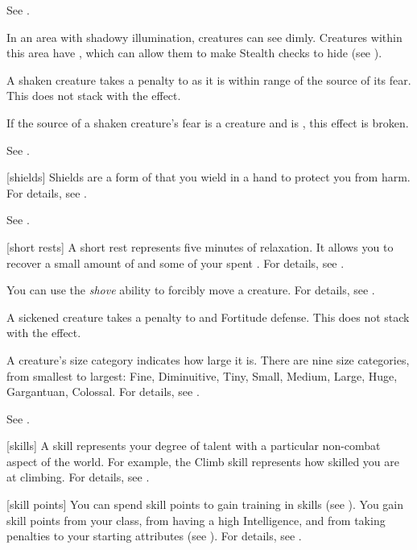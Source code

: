  See .

 In an area with shadowy illumination, creatures can see dimly.
Creatures within this area have \concealment, which can allow them to make Stealth checks to hide (see ).

 A shaken creature takes a  penalty to  as it is within \rngclose range of the source of its fear.
This does not stack with the  effect.

If the source of a shaken creature's fear is a creature and is , this effect is broken.

 See .

[shields] Shields are a form of  that you wield in a hand to protect you from harm.
For details, see .

 See .

[short rests] A short rest represents five minutes of relaxation.
It allows you to recover a small amount of  and some of your spent .
For details, see .

 You can use the \textit{shove} ability to forcibly move a creature.
For details, see .

 A sickened creature takes a  penalty to  and Fortitude defense.
This does not stack with the  effect.

 A creature's size category indicates how large it is.
There are nine size categories, from smallest to largest: Fine, Diminuitive, Tiny, Small, Medium, Large, Huge, Gargantuan, Colossal.
For details, see .

 See .

[skills] A skill represents your degree of talent with a particular non-combat aspect of the world.
For example, the Climb skill represents how skilled you are at climbing.
For details, see .

[skill points] You can spend skill points to gain training in skills (see ).
You gain skill points from your class, from having a high Intelligence, and from taking penalties to your starting attributes (see ).
For details, see .

